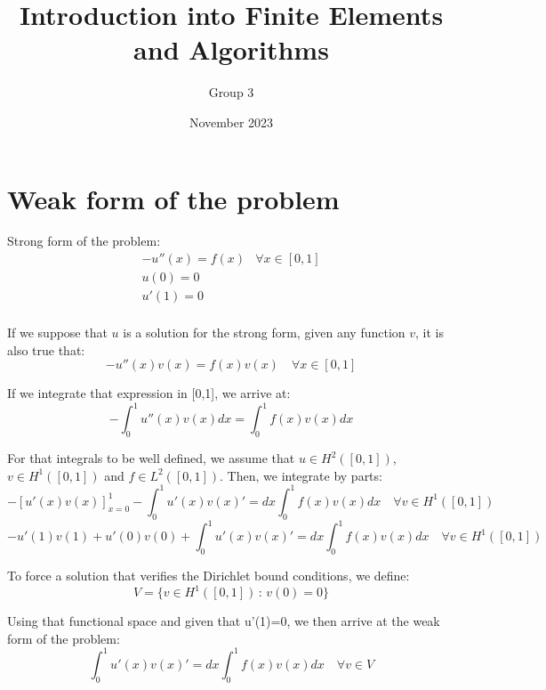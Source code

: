 \documentclass{article}
\title{Introduction into Finite Elements and Algorithms}
\author{Group 3}
\date{November 2023}
\begin{document}
\maketitle

\section{Weak form of the problem}
\noindent Strong form of the problem:
\[
\begin{array}{rcl}
     -u''(x) = f(x)& \forall x\in [0,1] \\
     u(0)=0& \\
     u'(1)=0& \\     
\end{array}
\]

\noindent If we suppose that $u$ is a solution for the strong form, given any function $v$, it is also true that:
\begin{equation*}
    -u''(x)v(x) = f(x)v(x) \quad \forall x\in [0,1]
\end{equation*}

\noindent If we integrate that expression in [0,1], we arrive at:
\begin{equation*}
    -\int_0^1 u''(x)v(x)dx = \int_0^1 f(x)v(x) dx
\end{equation*}

\noindent For that integrals to be well defined, we assume that $u\in H^2([0,1])$, $v\in H^1([0,1])$ and $f\in L^2([0,1])$. Then, we integrate by parts:
\begin{equation*}
    -[u'(x)v(x)]_{x=0}^{1}-\int_0^1 u'(x)v(x)'=dx \int_0^1 f(x)v(x) dx \quad\forall v\in H^1([0,1])
\end{equation*}
\begin{equation*}
    -u'(1)v(1)+u'(0)v(0)+\int_0^1 u'(x)v(x)'=dx \int_0^1 f(x)v(x) dx \quad\forall v\in H^1([0,1])
\end{equation*}

\noindent To force a solution that verifies the Dirichlet bound conditions, we define:
\begin{equation*}
    V=\{ v\in H^1([0,1]) \, : \, v(0)=0\}
\end{equation*}

\noindent Using that functional space and given that u'(1)=0, we then arrive at the weak form of the problem:
\begin{equation}
    \int_0^1 u'(x)v(x)'=dx \int_0^1 f(x)v(x) dx \quad\forall v\in V
\end{equation}
\end{document}
